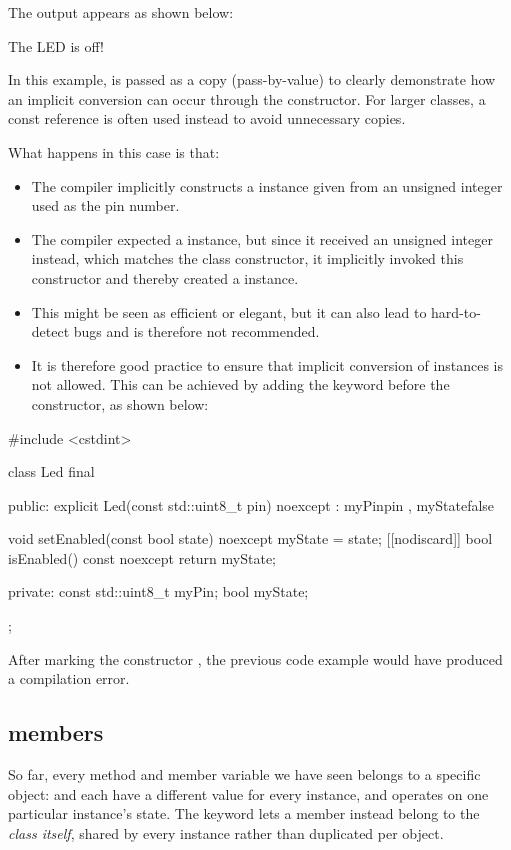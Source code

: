 \noindent The output appears as shown below:

\begin{console}
The LED is off!
\end{console}

\note In this example,  is passed as a copy (pass-by-value) to clearly demonstrate how an
implicit conversion can occur through the constructor. For larger classes, a const reference is
often used instead to avoid unnecessary copies.

What happens in this case is that:
\begin{itemize}
  \item The compiler implicitly constructs a  instance given from an unsigned integer used
    as the pin number.
  \item The compiler expected a  instance, but since it received an unsigned integer
    instead, which matches the class constructor, it implicitly invoked this constructor and
    thereby created a  instance.
  \item This might be seen as efficient or elegant, but it can also lead to hard-to-detect bugs and
    is therefore not recommended.
  \item It is therefore good practice to ensure that implicit conversion of  instances is
    not allowed. This can be achieved by adding the keyword  before the
    constructor, as shown below:
\end{itemize}

\begin{cppcode}
#include <cstdint>

class Led final
{
public:
    explicit Led(const std::uint8_t pin) noexcept
        : myPin{pin}
        , myState{false}
    {}

    void setEnabled(const bool state) noexcept { myState = state; }
    [[nodiscard]] bool isEnabled() const noexcept { return myState; }

private:
    const std::uint8_t myPin;
    bool myState;
};
\end{cppcode}

\noindent After marking the constructor , the previous code example would have
produced a compilation error.

\subsection{ members}
\label{c2:sec:static}
So far, every method and member variable we have seen belongs to a specific object: 
and  each have a different value for every  instance, and 
operates on one particular instance's state. The keyword  lets a member instead belong
to the \emph{class itself}, shared by every instance rather than duplicated per object.

